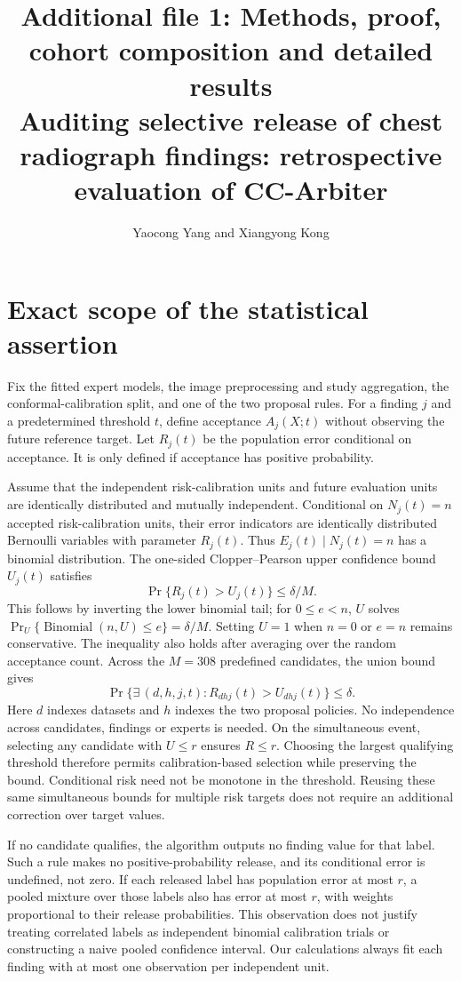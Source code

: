 \documentclass[10pt,a4paper]{article}
\title{Additional file 1: Methods, proof, cohort composition and detailed results\\[5pt]\large Auditing selective release of chest radiograph findings: retrospective evaluation of CC-Arbiter}
\author{Yaocong Yang and Xiangyong Kong}\date{}
\begin{document}
\maketitle
\section{Exact scope of the statistical assertion}
Fix the fitted expert models, the image preprocessing and study aggregation, the conformal-calibration split, and one of the two proposal rules. For a finding $j$ and a predetermined threshold $t$, define acceptance $A_j(X;t)$ without observing the future reference target. Let $R_j(t)$ be the population error conditional on acceptance. It is only defined if acceptance has positive probability.

Assume that the independent risk-calibration units and future evaluation units are identically distributed and mutually independent. Conditional on $N_j(t)=n$ accepted risk-calibration units, their error indicators are identically distributed Bernoulli variables with parameter $R_j(t)$. Thus $E_j(t)\mid N_j(t)=n$ has a binomial distribution. The one-sided Clopper--Pearson upper confidence bound $U_j(t)$ satisfies
\[
\Pr\{R_j(t)>U_j(t)\}\leq\delta/M.
\]
This follows by inverting the lower binomial tail; for $0\leq e<n$, $U$ solves $\Pr_{U}\{\operatorname{Binomial}(n,U)\leq e\}=\delta/M$. Setting $U=1$ when $n=0$ or $e=n$ remains conservative. The inequality also holds after averaging over the random acceptance count. Across the $M=308$ predefined candidates, the union bound gives
\[
\Pr\{\exists\, (d,h,j,t): R_{dhj}(t)>U_{dhj}(t)\}\leq\delta.
\]
Here $d$ indexes datasets and $h$ indexes the two proposal policies. No independence across candidates, findings or experts is needed. On the simultaneous event, selecting any candidate with $U\leq r$ ensures $R\leq r$. Choosing the largest qualifying threshold therefore permits calibration-based selection while preserving the bound. Conditional risk need not be monotone in the threshold. Reusing these same simultaneous bounds for multiple risk targets does not require an additional correction over target values.

If no candidate qualifies, the algorithm outputs no finding value for that label. Such a rule makes no positive-probability release, and its conditional error is undefined, not zero. If each released label has population error at most $r$, a pooled mixture over those labels also has error at most $r$, with weights proportional to their release probabilities. This observation does not justify treating correlated labels as independent binomial calibration trials or constructing a naive pooled confidence interval. Our calculations always fit each finding with at most one observation per independent unit.
\end{document}
